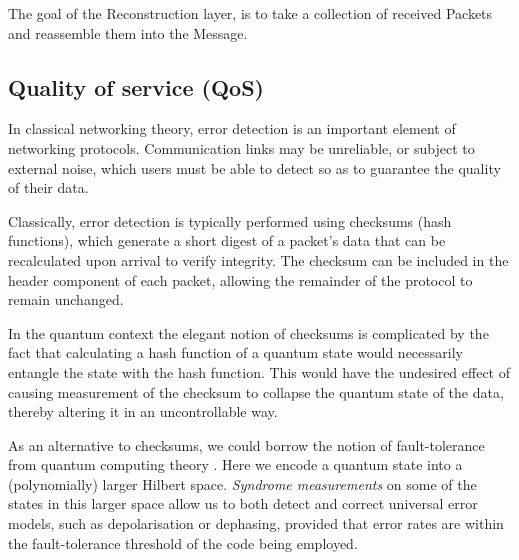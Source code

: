 \documentclass[aps,rmp,twocolumn,amsmath,amssymb,nofootinbib,superscriptaddress,longbibliography,floatfix]{revtex4-1}
\begin{document}
\begin{table}[!htb]
\caption{The goal of the {\sc Reconstruction} layer, is to take a collection of received {\sc Packets} and reassemble them into the {\sc Message}.} \label{tab:reconstruction}
\end{table}

%
%

\subsection{Quality of service (QoS)}

In classical networking theory, error detection is an important element of networking protocols. Communication links may be unreliable, or subject to external noise, which users must be able to detect so as to guarantee the quality of their data.

Classically, error detection is typically performed using checksums (hash functions), which generate a short digest of a packet's data that can be recalculated upon arrival to verify integrity. The checksum can be included in the header component of each packet, allowing the remainder of the protocol to remain unchanged.

In the quantum context the elegant notion of checksums is complicated by the fact that calculating a hash function of a quantum state would necessarily entangle the state with the hash function. This would have the undesired effect of causing measurement of the checksum to collapse the quantum state of the data, thereby altering it in an uncontrollable way.

As an alternative to checksums, we could borrow the notion of fault-tolerance from quantum computing theory \cite{???}. Here we encode a quantum state into a (polynomially) larger Hilbert space. \emph{Syndrome measurements} on some of the states in this larger space allow us to both detect and correct universal error models, such as depolarisation or dephasing, provided that error rates are within the fault-tolerance threshold of the code being employed.
\end{document}
